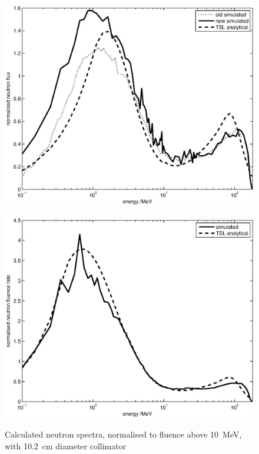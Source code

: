 \documentclass[peerreviewca,11pt,a4paper]{IEEEtran}
\let\MYoriglatexcaption\caption
\renewcommand{\caption}[2][\relax]{\MYoriglatexcaption[#2]{#2}}
\begin{document}
\begin{figure}[t]
    \begin{minipage}{\columnwidth}
        \centering
        \includegraphics[width=0.8\columnwidth]{SUPNormalisedRADECS.eps}
        \label{fig:LethargyplotSUP}
    \end{minipage}
    \begin{minipage}{\columnwidth}
        \centering
        \includegraphics[width=0.8\columnwidth]{CUPcomparedProkofiev2014NormalisedRADECS.eps}
        \label{fig:LethargyplotCUP}
    \end{minipage}
	\caption{
        Calculated neutron spectra, normalised to fluence above \SI{10}{\MeV}, with
        \SI{10.2}{\cm} diameter collimator
    }
	\label{fig:Lethargyplots}
\end{figure}
\end{document}
